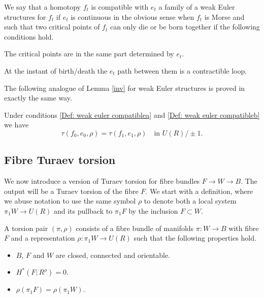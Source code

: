 \begin{definition}\label{Def: weak euler compatible} We say that a homotopy $f_t$ is compatible with $e_t$ a family of a weak Euler structures for $f_t$ if $e_t$ is continuous in the obvious sense when $f_t$ is Morse and such that two critical points of $f_t$ can only die or be born together if the following conditions hold.

\begin{enumeratea}
\item\label{Def: weak euler compatiblea}
The critical points are in the same part determined by $e_t$.
\item\label{Def: weak euler compatibleb}
At the instant of birth/death the $e_t$ path between them is a contractible loop.
\end{enumeratea}
\end{definition}

The following analogue of Lemma \ref{inv} for weak Euler structures is proved in exactly the same way.
\begin{lemma}\label{weakinv}
Under conditions \eqref{Def: weak euler compatiblea} and \eqref{Def: weak euler compatibleb} we have
\[
\tau(f_0,e_0, \rho)=\tau(f_1,e_1, \rho)\quad\text{in }U(R) / \pm1.
\]
\end{lemma}

\subsection{Fibre Turaev torsion}

We now introduce a version of Turaev torsion for fibre bundles $F \to W \to B$. The output will be a Turaev torsion of the fibre $F$. We start with a definition, where we abuse notation to use the same symbol $\rho$ to denote both a local system $\pi_1 W \to U(R)$ and its pullback to $\pi_1F$ by the inclusion $F \subset W$.

\begin{definition}\label{torsionpair}
A torsion pair $(\pi, \rho)$ consists of a fibre bundle of manifolds \hbox{$\pi: W \to B$} with fibre $F$ and a representation $\rho: \pi_1W \to U(R)$ such that the following properties hold.
\begin{itemize}
\item $B$, $F$ and $W$ are closed, connected and orientable.
\item $H^*(F; R^\rho)=0$.
\item $\rho(\pi_1F)=\rho(\pi_1W)$.
\end{itemize}
\end{definition}

